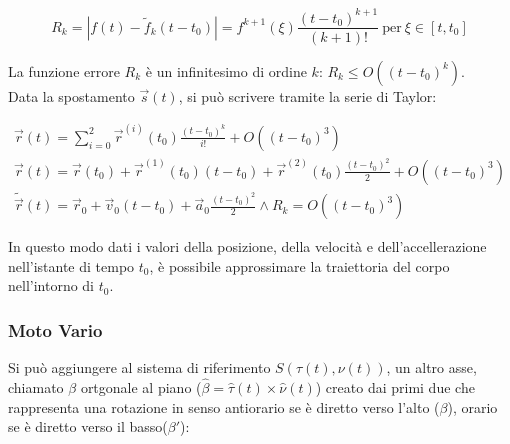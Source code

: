 \documentclass{article}
\numberwithin{equation}{subsection}
\begin{document}
\begin{equation}
    R_k=\displaystyle\left|f(t)-\tilde{f}_k(t-t_0)\right|=
    f^{k+1}(\xi)\frac{(t-t_0)^{k+1}}{(k+1)!}\:\mbox{per}\:
    \xi \in [t, t_0]
\end{equation}

La funzione errore $R_k$ è un infinitesimo di ordine $k$: 
$R_k \le O((t-t_0)^{k})$.\\

Data la spostamento $\vec{s}(t)$, si può scrivere tramite la 
serie di Taylor: 

\begin{gather}
    \vec{r}(t)=\sum_{i=0}^{2}\displaystyle\vec{r}^{(i)}(t_0)\frac{(t-t_0)^k}{i!}+O((t-t_0)^{3})\\
    \vec{r}(t)=\vec{r}(t_0) + \vec{r}^{(1)}(t_0)(t-t_0)+\vec{r}^{(2)}(t_0)\displaystyle\frac{(t-t_0)^{2}}{2}+O((t-t_0)^{3})\\
    \tilde{\vec{r}}(t)=\vec{r}_0+\vec{v}_0(t-t_0)+\vec{a}_0\displaystyle\frac{(t-t_0)^{2}}{2}\land R_k=O((t-t_0)^{3})
\end{gather}

In questo modo dati i valori della posizione, della velocità 
e dell'accellerazione nell'istante di tempo $t_0$, è possibile 
approssimare la traiettoria del corpo nell'intorno di $t_0$.

\subsubsection{Moto Vario}
Si può aggiungere al sistema di riferimento $S(\tau(t), \nu(t))$, un altro 
asse, chiamato $\beta$ ortgonale al piano ($\hat{\beta}=\hat{\tau}(t)\times\hat{\nu}(t)$) creato dai primi due 
che rappresenta una rotazione in senso antiorario se è diretto 
verso l'alto ($\beta$), orario se è diretto verso il basso($\beta'$):

\begin{center}\end{center}
\end{document}
